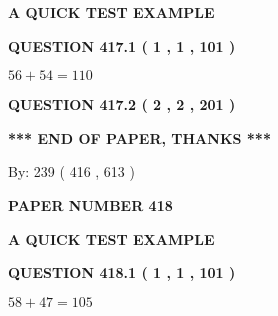 \documentclass[12pt]{article}
\begin{document}
   
 \vspace{0.2in}
{\LARGE {\textbf{ A QUICK TEST EXAMPLE}}}
   
   
  
\vspace{0.2in}
  
{\textbf{\Large{QUESTION
417.1 
 ( 1 , 1 , 101 )
}}}
  
  
 
 

$ %
56 +  %
54=   %
110$
 
 
  
\vspace{0.2in}
  
{\textbf{\Large{QUESTION
417.2 
 ( 2 , 2 , 201 )
}}}
  
  
   
   
 \vspace{0.2in}
 
   
   
   
   
\vspace{1.0in} 
{\textbf{\large{ *** END OF PAPER, THANKS *** }}} 
   
   
\hspace{1.0in} By: 
 239 ( 416 ,  613 )
   
   
   
   
\newpage 
\setcounter{page}{ 
   418001 } 
   
   
   
   
 {\textbf{ \Large{ PAPER NUMBER  418  }}}
   
   
\vspace{0.2in}
   
   
   
   
   
   
 \vspace{0.2in}
{\LARGE {\textbf{ A QUICK TEST EXAMPLE}}}
   
   
  
\vspace{0.2in}
  
{\textbf{\Large{QUESTION
418.1 
 ( 1 , 1 , 101 )
}}}
  
  
 
 

$ %
58 +  %
47=   %
105$
 
 
  
\vspace{0.2in}
  
\end{document}
